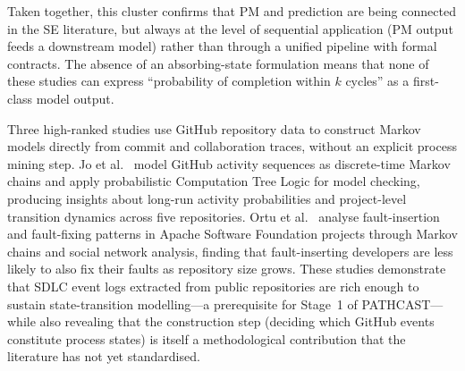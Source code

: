 Taken together, this cluster confirms that PM and prediction are being
connected in the SE literature, but always at the level of sequential
application (PM output feeds a downstream model) rather than through a
unified pipeline with formal contracts. The absence of an absorbing-state
formulation means that none of these studies can express ``probability of
completion within $k$ cycles'' as a first-class model output.



Three high-ranked studies use GitHub repository data to construct Markov
models directly from commit and collaboration traces, without an explicit
process mining step. Jo et al.~\cite{jo2023,jo2024} model GitHub activity
sequences as discrete-time Markov chains and apply probabilistic Computation
Tree Logic for model checking, producing insights about long-run activity
probabilities and project-level transition dynamics across five repositories.
Ortu et al.~\cite{ortu2023} analyse fault-insertion and fault-fixing patterns
in Apache Software Foundation projects through Markov chains and social
network analysis, finding that fault-inserting developers are less likely to
also fix their faults as repository size grows. These studies demonstrate that
SDLC event logs extracted from public repositories are rich enough to sustain
state-transition modelling---a prerequisite for Stage~1 of PATHCAST---while
also revealing that the construction step (deciding which GitHub events
constitute process states) is itself a methodological contribution that the
literature has not yet standardised.




